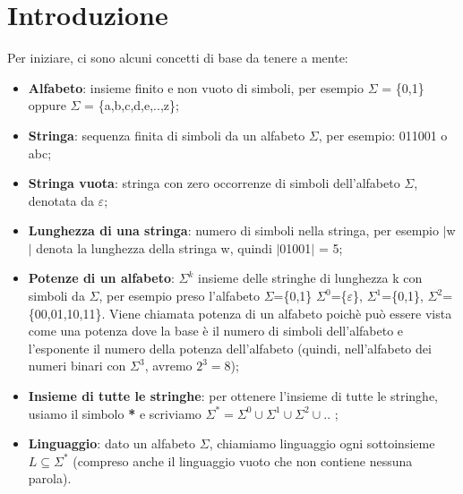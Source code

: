\chapter{Introduzione}
Per iniziare, ci sono alcuni concetti di base da tenere a mente:

\begin{itemize}

\item \textbf{Alfabeto}: insieme finito e non vuoto di simboli, per esempio
$\Sigma$ = \{0,1\} oppure $\Sigma$ = \{a,b,c,d,e,..,z\};
\item \textbf{Stringa}: sequenza finita di simboli da un alfabeto $\Sigma$, per 
esempio: 011001 o abc;
\item \textbf{Stringa vuota}: stringa con zero occorrenze di simboli dell'alfabeto 
$\Sigma$, denotata da $\varepsilon$;
\item \textbf{Lunghezza di una stringa}: numero di simboli nella stringa, per 
esempio $|$w$|$ denota la lunghezza della stringa w, quindi $|$01001$|$ = 5;
\item \textbf{Potenze di un alfabeto}: $\Sigma^{k}$ insieme delle stringhe di 
lunghezza k con simboli da $\Sigma$, per esempio preso l'alfabeto $\Sigma$=\{0,1\}
$\Sigma^{0}$=\{$\varepsilon$\}, $\Sigma^{1}$=\{0,1\}, $\Sigma^{2}$=\{00,01,10,11\}.
Viene chiamata potenza di un alfabeto poichè può essere vista come una potenza dove 
la base è il numero di simboli dell'alfabeto e l'esponente il numero della potenza
dell'alfabeto (quindi, nell'alfabeto dei numeri binari con $\Sigma^{3}$, avremo
 $2^{3}=8$);
\item \textbf{Insieme di tutte le stringhe}: per ottenere l'insieme di tutte le 
stringhe, usiamo il simbolo \textbf{*} e scriviamo $\Sigma^{*}=\Sigma^{0} \cup 
\Sigma^{1} \cup \Sigma^{2} \cup ..$ ;
\item \textbf{Linguaggio}: dato un alfabeto $\Sigma$, chiamiamo linguaggio ogni
sottoinsieme $L\subseteq\Sigma^{*}$ (compreso anche il linguaggio vuoto che non 
contiene nessuna parola).

\end{itemize}
